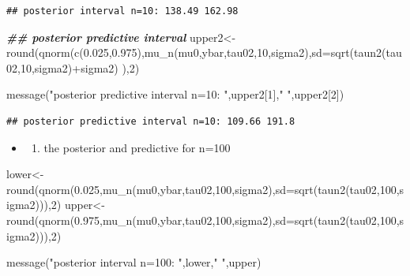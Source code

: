 \documentclass[
]{book}
\newenvironment{Shaded}{\begin{snugshade}}{\end{snugshade}}
\newcommand{\AttributeTok}[1]{\textcolor[rgb]{0.77,0.63,0.00}{#1}}
\newcommand{\DecValTok}[1]{\textcolor[rgb]{0.00,0.00,0.81}{#1}}
\newcommand{\DocumentationTok}[1]{\textcolor[rgb]{0.56,0.35,0.01}{\textbf{\textit{#1}}}}
\newcommand{\FloatTok}[1]{\textcolor[rgb]{0.00,0.00,0.81}{#1}}
\newcommand{\FunctionTok}[1]{\textcolor[rgb]{0.00,0.00,0.00}{#1}}
\newcommand{\NormalTok}[1]{#1}
\newcommand{\OtherTok}[1]{\textcolor[rgb]{0.56,0.35,0.01}{#1}}
\newcommand{\SpecialCharTok}[1]{\textcolor[rgb]{0.00,0.00,0.00}{#1}}
\newcommand{\StringTok}[1]{\textcolor[rgb]{0.31,0.60,0.02}{#1}}
\providecommand{\tightlist}{%
  \setlength{\itemsep}{0pt}\setlength{\parskip}{0pt}}
\theoremstyle{definition}
\theoremstyle{definition}
\theoremstyle{definition}
\theoremstyle{definition}
\theoremstyle{remark}
\begin{document}
\begin{verbatim}
## posterior interval n=10: 138.49 162.98
\end{verbatim}

\begin{Shaded}
\begin{Highlighting}[]
\DocumentationTok{\#\# posterior predictive interval}
\NormalTok{  upper2}\OtherTok{\textless{}{-}}\FunctionTok{round}\NormalTok{(}\FunctionTok{qnorm}\NormalTok{(}\FunctionTok{c}\NormalTok{(}\FloatTok{0.025}\NormalTok{,}\FloatTok{0.975}\NormalTok{),}\FunctionTok{mu\_n}\NormalTok{(mu0,ybar,tau02,}\DecValTok{10}\NormalTok{,sigma2),}\AttributeTok{sd=}\FunctionTok{sqrt}\NormalTok{(}\FunctionTok{taun2}\NormalTok{(tau02,}\DecValTok{10}\NormalTok{,sigma2)}\SpecialCharTok{+}\NormalTok{sigma2) ),}\DecValTok{2}\NormalTok{)}

\FunctionTok{message}\NormalTok{(}\StringTok{"posterior predictive interval n=10: "}\NormalTok{,upper2[}\DecValTok{1}\NormalTok{],}\StringTok{" "}\NormalTok{,upper2[}\DecValTok{2}\NormalTok{])}
\end{Highlighting}
\end{Shaded}

\begin{verbatim}
## posterior predictive interval n=10: 109.66 191.8
\end{verbatim}

\begin{itemize}
\item
  \begin{enumerate}
  \def\labelenumi{(\alph{enumi})}
  \setcounter{enumi}{3}
  \tightlist
  \item
    the posterior and predictive for n=100
  \end{enumerate}
\end{itemize}

\begin{Shaded}
\begin{Highlighting}[]
\NormalTok{ lower}\OtherTok{\textless{}{-}}\FunctionTok{round}\NormalTok{(}\FunctionTok{qnorm}\NormalTok{(}\FloatTok{0.025}\NormalTok{,}\FunctionTok{mu\_n}\NormalTok{(mu0,ybar,tau02,}\DecValTok{100}\NormalTok{,sigma2),}\AttributeTok{sd=}\FunctionTok{sqrt}\NormalTok{(}\FunctionTok{taun2}\NormalTok{(tau02,}\DecValTok{100}\NormalTok{,sigma2))),}\DecValTok{2}\NormalTok{)}
\NormalTok{    upper}\OtherTok{\textless{}{-}}\FunctionTok{round}\NormalTok{(}\FunctionTok{qnorm}\NormalTok{(}\FloatTok{0.975}\NormalTok{,}\FunctionTok{mu\_n}\NormalTok{(mu0,ybar,tau02,}\DecValTok{100}\NormalTok{,sigma2),}\AttributeTok{sd=}\FunctionTok{sqrt}\NormalTok{(}\FunctionTok{taun2}\NormalTok{(tau02,}\DecValTok{100}\NormalTok{,sigma2))),}\DecValTok{2}\NormalTok{)}

\FunctionTok{message}\NormalTok{(}\StringTok{"posterior interval n=100: "}\NormalTok{,lower,}\StringTok{" "}\NormalTok{,upper)}
\end{Highlighting}
\end{Shaded}
\end{document}
